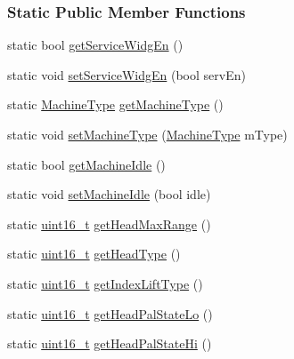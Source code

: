 \subsubsection*{Static Public Member Functions}
\begin{DoxyCompactItemize}
\item 
static bool \mbox{\hyperlink{classMachineSettings_aed23d5dfd20513c309956d187e0b7a3b}{get\+Service\+Widg\+En}} ()
\item 
static void \mbox{\hyperlink{classMachineSettings_a849f1eefa33684d98531d4052b9923e1}{set\+Service\+Widg\+En}} (bool serv\+En)
\item 
static \mbox{\hyperlink{classMachineSettings_af95330ff3a80de06fe956f5297ec0fc5}{Machine\+Type}} \mbox{\hyperlink{classMachineSettings_a0349f2cb52c9359909722942a831aeae}{get\+Machine\+Type}} ()
\item 
static void \mbox{\hyperlink{classMachineSettings_aba8aeb52eef51e98eedb65a52d22ab0f}{set\+Machine\+Type}} (\mbox{\hyperlink{classMachineSettings_af95330ff3a80de06fe956f5297ec0fc5}{Machine\+Type}} m\+Type)
\item 
static bool \mbox{\hyperlink{classMachineSettings_a232ca3eed7f64a1721e23f1bf3ad9243}{get\+Machine\+Idle}} ()
\item 
static void \mbox{\hyperlink{classMachineSettings_a81d10b1a8eef770d08c22df5796dbd8b}{set\+Machine\+Idle}} (bool idle)
\item 
static \mbox{\hyperlink{settings_8h_a017dd44e68049ffdd31500a8cd01ba68}{uint16\+\_\+t}} \mbox{\hyperlink{classMachineSettings_a77384a60e0ded049aa4c4a5c0b5e193b}{get\+Head\+Max\+Range}} ()
\item 
static \mbox{\hyperlink{settings_8h_a017dd44e68049ffdd31500a8cd01ba68}{uint16\+\_\+t}} \mbox{\hyperlink{classMachineSettings_a806a1562aea709bb99a614485ee5401e}{get\+Head\+Type}} ()
\item 
static \mbox{\hyperlink{settings_8h_a017dd44e68049ffdd31500a8cd01ba68}{uint16\+\_\+t}} \mbox{\hyperlink{classMachineSettings_acb8ca9e673941dd7abb8c429e9525f2a}{get\+Index\+Lift\+Type}} ()
\item 
static \mbox{\hyperlink{settings_8h_a017dd44e68049ffdd31500a8cd01ba68}{uint16\+\_\+t}} \mbox{\hyperlink{classMachineSettings_a8b0acb6f0ad4a795c8ea18338c035e14}{get\+Head\+Pal\+State\+Lo}} ()
\item 
static \mbox{\hyperlink{settings_8h_a017dd44e68049ffdd31500a8cd01ba68}{uint16\+\_\+t}} \mbox{\hyperlink{classMachineSettings_aca60698179b068072b45bea26c919da9}{get\+Head\+Pal\+State\+Hi}} ()
\item 

\end{DoxyCompactItemize}

